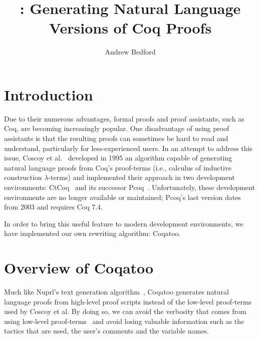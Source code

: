 \documentclass[sigplan,9pt]{acmart}\settopmatter{printfolios=true,printccs=false,printacmref=false}
\begin{document}
\title[Coqatoo]{\coqatoo: Generating Natural Language Versions of Coq Proofs}


\author{Andrew Bedford}



\maketitle

\section{Introduction}
Due to their numerous advantages, formal proofs and proof assistants, such as Coq, are becoming increasingly popular. One disadvantage of using proof assistants is that the resulting proofs can sometimes be hard to read and understand, particularly for less-experienced users. In an attempt to address this issue, Coscoy et al.~\cite{DBLP:conf/tlca/CoscoyKT95} developed in 1995 an algorithm capable of generating natural language proofs from Coq's proof-terms (i.e., calculus of inductive construction $\lambda$-terms) and implemented their approach in two development environments: CtCoq~\cite{CtCoq,bertot1999ctcoq} and its successor Pcoq~\cite{Pcoq,amerkad2001mathematics}. Unfortunately, these development environments are no longer available or maintained; Pcoq's last version dates from 2003 and requires Coq 7.4.

In order to bring this useful feature to modern development environments, we have implemented our own rewriting algorithm: Coqatoo.


\section{Overview of Coqatoo}
Much like Nuprl's text generation algorithm~\cite{DBLP:conf/aaai/Holland-MinkleyBC99}, Coqatoo generates natural language proofs from high-level proof scripts instead of the low-level proof-terms used by Coscoy et al. By doing so, we can avoid the verbosity that comes from using low-level proof-terms~\cite{DBLP:conf/lacl/Coscoy96} and avoid losing valuable information such as the tactics that are used, the user's comments and the variable names. 
\end{document}
